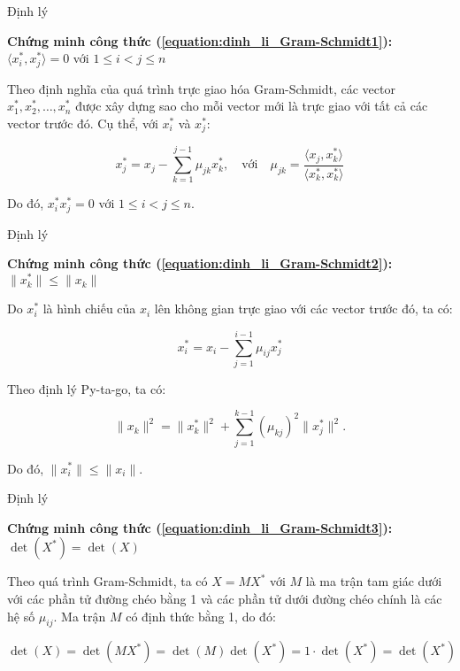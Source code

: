 \begin{frame}{Định lý}

\textbf{Chứng minh công thức (\ref{equation:dinh_li_Gram-Schmidt1}):}
$\langle x_i^*, x_j^* \rangle = 0$ với $1 \leq i < j \leq n$

Theo định nghĩa của quá trình trực giao hóa Gram-Schmidt,
các vector $x_1^*, x_2^*, \ldots, x_n^*$ được xây dựng sao cho
mỗi vector mới là trực giao với tất cả các vector trước đó.
Cụ thể, với $x_i^*$ và $x_j^*$:

\[
x_j^* = x_j - \sum_{k=1}^{j-1} \mu_{jk} x_k^*, \quad \text{với} \quad \mu_{jk} = \frac{\langle x_j, x_k^* \rangle}{\langle x_k^*, x_k^* \rangle}
\]

Do đó, $ x_i^* x_j^* = 0$ với $1 \leq i < j \leq n$.

\end{frame}
\begin{frame}{Định lý}

\textbf{Chứng minh công thức (\ref{equation:dinh_li_Gram-Schmidt2}):}
$\|x_k^*\| \leq \|x_k\|$

Do $x_i^*$ là hình chiếu của $x_i$ lên không gian trực giao với các vector trước đó, ta có:

\[
x_i^* = x_i - \sum_{j=1}^{i-1} \mu_{ij} x_j^*
\]

Theo định lý Py-ta-go, ta có:

\[
\|x_k\|^2 = \|x_k^*\|^2 + \sum_{j=1}^{k-1} (\mu_{kj})^2 \|x_j^*\|^2.
\]

Do đó, $\|x_i^*\| \leq \|x_i\|$.

\end{frame}
\begin{frame}{Định lý}

\textbf{Chứng minh công thức (\ref{equation:dinh_li_Gram-Schmidt3}):}
$\det(X^*) = \det(X)$

Theo quá trình Gram-Schmidt, ta có $X = MX^*$
với $M$ là ma trận tam giác dưới với các phần tử đường chéo bằng 1 và các phần tử dưới đường chéo chính là các hệ số $\mu_{ij}$.
Ma trận $M$ có định thức bằng 1, do đó:

\[
\det(X) = \det(MX^*) = \det(M) \det(X^*) = 1 \cdot \det(X^*) = \det(X^*)
\]

\end{frame}
